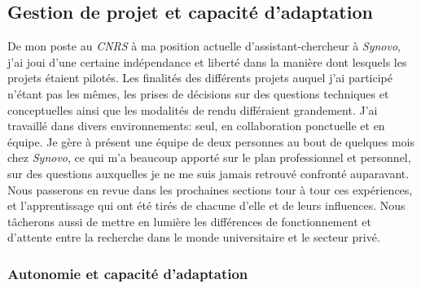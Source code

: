 \documentclass[french, 11pt]{memoir}
\begin{document}
\subsection{Gestion de projet et capacité
d'adaptation}\label{gestion-de-projet-et-capacituxe9-dadaptation}

De mon poste au \emph{CNRS} à ma position actuelle d'assistant-chercheur
à \emph{Synovo}, j'ai joui d'une certaine indépendance et liberté dans
la manière dont lesquels les projets étaient pilotés. Les finalités des
différents projets auquel j'ai participé n'étant pas les mêmes, les
prises de décisions sur des questions techniques et conceptuelles ainsi
que les modalités de rendu différaient grandement. J'ai travaillé dans
divers environnements: seul, en collaboration ponctuelle et en équipe.
Je gère à présent une équipe de deux personnes au bout de quelques mois
chez \emph{Synovo}, ce qui m'a beaucoup apporté sur le plan
professionnel et personnel, sur des questions auxquelles je ne me suis
jamais retrouvé confronté auparavant. \\
Nous passerons en revue dans les
prochaines sections tour à tour ces expériences, et l'apprentissage qui
ont été tirés de chacune d'elle et de leurs influences. Nous tâcherons
aussi de mettre en lumière les différences de fonctionnement et
d'attente entre la recherche dans le monde universitaire et le secteur
privé.

\subsubsection{Autonomie et capacité
d'adaptation}\label{autonomie-et-capacituxe9-dadaptation}
\end{document}
